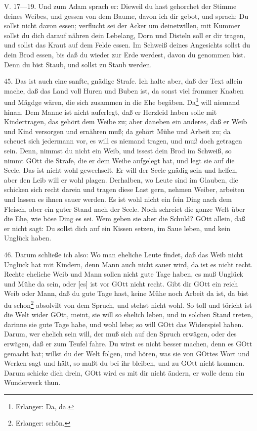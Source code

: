 \begin{schriftzitat}
V. 17—19. Und zum Adam sprach er: Dieweil du hast gehorchet der Stimme deines Weibes, und gessen von dem Baume, davon ich dir gebot, und sprach: Du sollst nicht davon essen; verflucht sei der Acker um deinetwillen, mit Kummer sollst du dich darauf nähren dein Lebelang, Dorn und Disteln soll er dir tragen, und sollst das Kraut auf dem Felde essen. Im Schweiß deines Angesichts sollst du dein Brod essen, bis daß du wieder zur Erde werdest, davon du genommen bist. Denn du bist Staub, und sollst zu Staub werden.
\end{schriftzitat}

45. Das ist auch eine sanfte, gnädige Strafe. Ich halte aber, daß der Text allein mache, daß das Land voll Huren und Buben ist, da sonst viel frommer Knaben und Mägdge wären, die sich zusammen in die Ehe begäben. Da\footnote{Erlanger: Da, da.} will niemand hinan. Dem Manne ist nicht auferlegt, daß er Herzleid haben solle mit Kindertragen, das gehört dem Weibe zu; aber daneben ein anderes, daß er Weib und Kind versorgen und ernähren muß; da gehört Mühe und Arbeit zu; da scheuet sich jedermann vor, es will es niemand tragen, und muß doch getragen sein. Denn, nimmst du nicht ein Weib, und issest dein Brod im Schweiß, so nimmt GOtt die Strafe, die er dem Weibe aufgelegt hat, und legt sie auf die Seele. Das ist nicht wohl gewechselt. Er will der Seele gnädig sein und helfen, aber den Leib will er wohl plagen. Derhalben, wo Leute sind im Glauben, die schicken sich recht darein und tragen diese Last gern, nehmen Weiber, arbeiten und lassen es ihnen sauer werden. Es ist wohl nicht ein fein Ding nach dem Fleisch, aber ein guter Stand nach der Seele. Noch schreiet die ganze Welt über die Ehe, wie böse Ding es sei. Wem geben sie aber die Schuld? GOtt allein, daß er nicht sagt: Du sollst dich auf ein Kissen setzen, im Saue leben, und kein Unglück haben.

46. Darum schließe ich also: Wo man eheliche Leute findet, daß das Weib nicht Unglück hat mit Kindern, denn Mann auch nicht sauer wird, da ist es nicht recht. Rechte eheliche Weib und Mann sollen nicht gute Tage haben, es muß Unglück und Mühe da sein, oder [es] ist vor GOtt nicht recht. Gibt dir GOtt ein reich Weib oder Mann, daß du gute Tage hast, keine Mühe noch Arbeit da ist, da bist du schon\footnote{Erlanger: schön.} absolvilt von dem Spruch, und stehst nicht wohl. So toll und töricht ist die Welt wider GOtt, meint, sie will so ehelich leben, und in solchen Stand treten, darinne sie gute Tage habe, und wohl lebe; so will GOtt das Widerspiel haben. Darum, wer ehelich sein will, der muß sich auf den Spruch erwägen, oder des erwägen, daß er zum Teufel fahre. Du wirst es nicht besser machen, denn es GOtt gemacht hat; willst du der Welt folgen, und hören, was sie von GOttes Wort und Werken sagt und hält, so mußt du bei ihr bleiben, und zu GOtt nicht kommen. Darum schicke dich drein, GOtt wird es mit dir nicht ändern, er wolle denn ein Wunderwerk thun.

